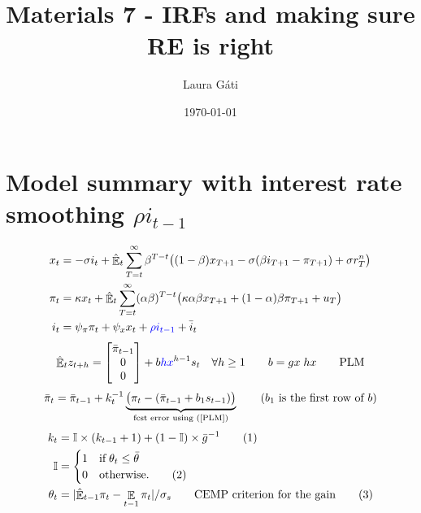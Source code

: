 \documentclass[11pt]{article}
\renewcommand{\[}{\begin{equation}}
\renewcommand{\]}{\end{equation}}
\DeclareMathOperator{\E}{\mathbb{E}}
\newcommand\numberthis{\addtocounter{equation}{1}\tag{\theequation}} %
\begin{document}
\linespread{1.0}

\title{Materials 7 - IRFs and making sure RE is right}
\author{Laura G\'ati} 
\date{\today}
\maketitle


\tableofcontents




\newpage
\section{Model summary with interest rate smoothing $\rho i_{t-1}$}
\begin{align}
x_t &=  -\sigma i_t +\hat{\E}_t \sum_{T=t}^{\infty} \beta^{T-t }\big( (1-\beta)x_{T+1} - \sigma(\beta i_{T+1} - \pi_{T+1}) +\sigma r_T^n \big)  \label{prestons18}  \\
\pi_t &= \kappa x_t +\hat{\E}_t \sum_{T=t}^{\infty} (\alpha\beta)^{T-t }\big( \kappa \alpha \beta x_{T+1} + (1-\alpha)\beta \pi_{T+1} + u_T\big) \label{prestons19}  \\
i_t &= \psi_{\pi}\pi_t + \psi_{x} x_t  + \textcolor{blue}{\rho i_{t-1}} + \bar{i}_t \label{TR}
\end{align}
\begin{equation}
\hat{\E}_t z_{t+h} =  \begin{bmatrix}\bar{\pi}_{t-1} \\ 0 \\ 0 \end{bmatrix}+ b\textcolor{blue}{hx}^{h-1}s_t  \quad \forall h\geq 1 \quad \quad b = gx \; hx \quad \quad \text{PLM} \label{PLM}
\end{equation}
\begin{equation}
\bar{\pi}_{t} = \bar{\pi}_{t-1} +k_t^{-1}\underbrace{\big(\pi_{t} -(\bar{\pi}_{t-1}+b_1s_{t-1}) \big)}_{\text{fcst error using (\ref{PLM})} } \quad \quad  \text{($b_1$ is the first row of $b$)}
\end{equation}
 \begin{align*}
k_t & = \mathbb{I}\times(k_{t-1}+1) + (1-\mathbb{I}) \times \bar{g}^{-1}  \label{gain} \numberthis\\
\mathbb{I} & = \begin{cases} 1 \quad \text{if} \; \theta_t \leq \bar{\theta}  \\ 0 \quad \text{otherwise.}\numberthis
\end{cases} \\
\theta_t & = |\hat{\E}_{t-1}\pi_t - \E_{t-1}\pi_t| / \sigma_s \quad \quad \text{CEMP criterion for the gain}\label{criterion}\numberthis
\end{align*}
\end{document}
